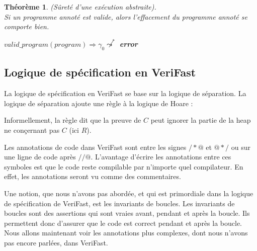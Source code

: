 \documentclass[11pt,openany]{article}
\newcommand{\verifast}{VeriFast}
\newtheorem{theorem}{Th\'eor\`eme}
\begin{document}
		\begin{theorem}
			(S\^uret\'e d'une ex\'ecution abstraite).\\
			Si un programme annot\'e est valide, alors l'effacement du programme annot\'e se comporte bien.
			\begin{center}
			$valid\_program(program)\Rightarrow\gamma_0 \not\leadsto^*$ \textbf{error}
			\end{center}
		\end{theorem}
	
		
	\subsection{Logique de sp\'ecification en \verifast{}}
		La logique de sp\'ecification en \verifast{} se base sur la logique de s\'eparation. La logique de s\'eparation ajoute une r\`egle \`a la logique de Hoare :
		\begin{center}
		


		\end{center}
		Informellement, la r\`egle dit que la preuve de $C$ peut ignorer la partie de la heap ne con\c{c}ernant pas $C$ (ici $R$).\par
		Les annotations de code dans \verifast{} sont entre les signes $/*@$ et $@*/$ ou sur une ligne de code apr\`es $//@$. L'avantage d'\'ecrire les annotations entre ces symboles est que le code reste compilable par n'importe quel compilateur. En effet, les annotations seront vu comme des commentaires.\par
		Une notion, que nous n'avons pas abord\'ee, et qui est primordiale dans la logique de sp\'ecification de \verifast, est les invariants de boucles. Les invariants de boucles sont des assertions qui sont vraies avant, pendant et apr\`es la boucle. Ils permettent donc d'assurer que le code est correct pendant et apr\`es la boucle. Nous allons maintenant voir les annotations plus complexes, dont nous n'avons pas encore parl\'ees, dans \verifast.
\end{document}
